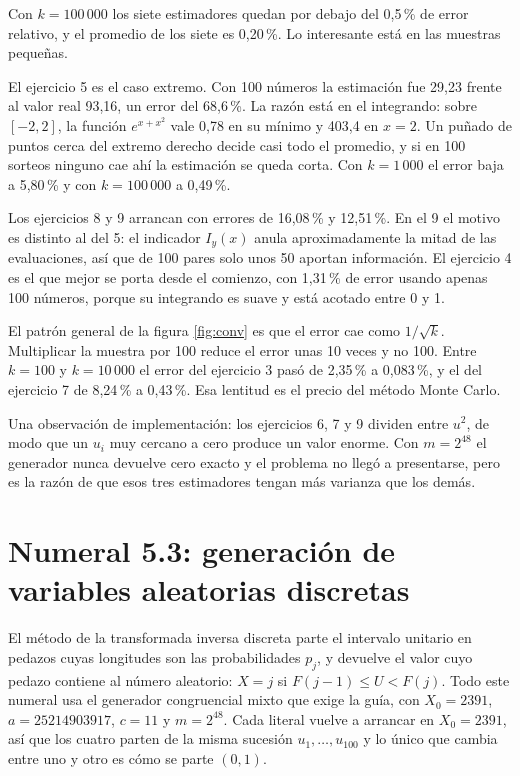 \documentclass[11pt,letterpaper]{article}
\begin{document}
Con $k = 100\,000$ los siete estimadores quedan por debajo del 0,5\,\% de error relativo, y el
promedio de los siete es 0,20\,\%. Lo interesante está en las muestras pequeñas.

El ejercicio 5 es el caso extremo. Con 100 números la estimación fue 29,23 frente al valor real
93,16, un error del 68,6\,\%. La razón está en el integrando: sobre $[-2,2]$, la función $e^{x+x^2}$
vale 0,78 en su mínimo y 403,4 en $x = 2$. Un puñado de puntos cerca del extremo derecho decide casi
todo el promedio, y si en 100 sorteos ninguno cae ahí la estimación se queda corta. Con $k = 1\,000$
el error baja a 5,80\,\% y con $k = 100\,000$ a 0,49\,\%.

Los ejercicios 8 y 9 arrancan con errores de 16,08\,\% y 12,51\,\%. En el 9 el motivo es distinto al
del 5: el indicador $I_y(x)$ anula aproximadamente la mitad de las evaluaciones, así que de 100 pares
solo unos 50 aportan información. El ejercicio 4 es el que mejor se porta desde el comienzo, con
1,31\,\% de error usando apenas 100 números, porque su integrando es suave y está acotado entre 0 y 1.

El patrón general de la figura \ref{fig:conv} es que el error cae como $1/\sqrt{k}$. Multiplicar la
muestra por 100 reduce el error unas 10 veces y no 100. Entre $k=100$ y $k=10\,000$ el error del
ejercicio 3 pasó de 2,35\,\% a 0,083\,\%, y el del ejercicio 7 de 8,24\,\% a 0,43\,\%. Esa lentitud
es el precio del método Monte Carlo.

Una observación de implementación: los ejercicios 6, 7 y 9 dividen entre $u^2$, de modo que un $u_i$
muy cercano a cero produce un valor enorme. Con $m = 2^{48}$ el generador nunca devuelve cero exacto y
el problema no llegó a presentarse, pero es la razón de que esos tres estimadores tengan más varianza
que los demás.

\section{Numeral 5.3: generación de variables aleatorias discretas}

El método de la transformada inversa discreta parte el intervalo unitario en pedazos cuyas longitudes
son las probabilidades $p_j$, y devuelve el valor cuyo pedazo contiene al número aleatorio:
$X = j$ si $F(j-1) \le U < F(j)$. Todo este numeral usa el generador congruencial mixto que exige la
guía, con $X_0 = 2391$, $a = 25214903917$, $c = 11$ y $m = 2^{48}$. Cada literal vuelve a arrancar en
$X_0 = 2391$, así que los cuatro parten de la misma sucesión $u_1, \dots, u_{100}$ y lo único que
cambia entre uno y otro es cómo se parte $(0,1)$.
\end{document}
